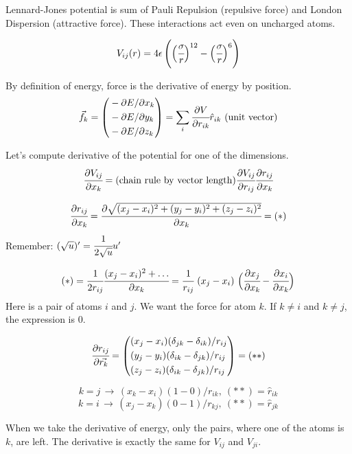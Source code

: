 \documentclass[12pt,a4paper]{article}
\newcommand{\infers}{\,\to\,}
\newcommand{\mat}[1]{\vec{#1}}
\begin{document}
Lennard-Jones potential \cite{lennard-jones} is sum of Pauli Repulsion (repulsive force) and London Dispersion (attractive force). These interactions act even on uncharged atoms.

\[
V_{ij}(r) = 4\epsilon \left( \Bigl(\cfrac{\sigma}{r}\Bigr)^{12} - \Bigl(\cfrac{\sigma}{r}\Bigr)^{6} \right)
\]

By definition of energy, force is the derivative of energy by position.
\[
\mat{f}_k = \left( \begin{aligned}
	& - \partial E / \partial x_k \\
	& - \partial E / \partial y_k \\
	& - \partial E / \partial z_k \\
\end{aligned} \right) = \sum_i \cfrac{\partial V}{\partial r_{ik}} {\hat r_{ik}} \text{\ (unit vector)}
\]

Let's compute derivative of the potential for one of the dimensions.
\[
\cfrac{\partial V_{ij}}{\partial x_k} = \text{(chain rule by vector length)} \cfrac{\partial V_{ij}}{\partial r_{ij}} \cfrac{\partial r_{ij}}{\partial x_k}
\]

\[ \cfrac{\partial r_{ij}}{\partial x_k} = \cfrac{\partial \sqrt{(x_j-x_i)^2 + (y_j-y_i)^2 + (z_j-z_i)^2  }}{\partial x_k} = (*) \]
Remember: \( (\sqrt{u})' = \cfrac{1}{2\sqrt{u}} u' \)

\[
(*) = \cfrac{1}{2r_{ij}} \cfrac{(x_j-x_i)^2+\ldots}{\partial x_k} = \cfrac{1}{r_{ij}} \ (x_j-x_i) \ \Bigl(\cfrac{\partial x_j}{\partial x_k} - \cfrac{\partial x_i}{\partial x_k}\Bigr)
\]
Here is a pair of atoms $i$ and $j$. We want the force for atom $k$. If \(k\neq i\) and \(k\neq j\), the expression is 0.

\[
\cfrac{\partial r_{ij}}{\partial \mat{r_k}} = \left( \begin{aligned}
	& (x_j - x_i) (\delta_{jk} - \delta_{ik}) / r_{ij} \\
	& (y_j - y_i) (\delta_{ik} - \delta_{jk}) / r_{ij} \\
	& (z_j - z_i) (\delta_{ik} - \delta_{jk}) / r_{ij} \\
\end{aligned} \right) = (**)
\]

\[
k=j \infers (x_k-x_i)(1-0)/r_{ik},\ (**) = {\hat r_{ik}}
\]
\[
k=i \infers (x_j-x_k)(0-1)/r_{kj},\ (**) = {\hat r_{jk}}
\]

When we take the derivative of energy, only the pairs, where one of the atoms is \(k\), are left. The derivative is exactly the same for \(V_{ij}\) and \(V_{ji}\).
\end{document}
